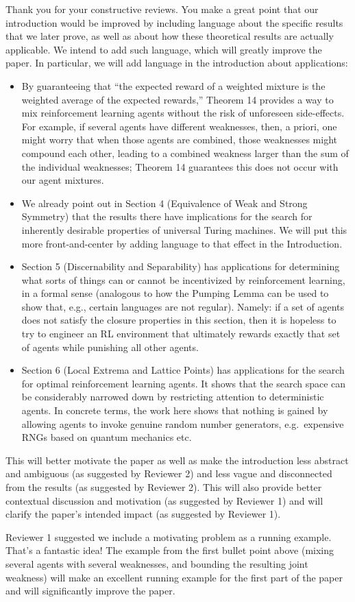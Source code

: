 \documentclass{article}
\begin{document}
Thank you for your constructive reviews. You make a great point that our introduction would
be improved by including language about the specific results that we later prove, as well as
about how these theoretical results are actually applicable. We intend to add such
language, which will greatly improve the paper. In particular, we will add language in
the introduction about applications:
\begin{itemize}
    \item
    By guaranteeing that ``the expected reward of a weighted mixture is the weighted
    average of the expected rewards,'' Theorem 14 provides a way to mix reinforcement
    learning agents without the risk of unforeseen side-effects. For example, if several
    agents have different weaknesses,
    then, a priori, one might worry that when those agents are combined, those weaknesses
    might compound each other, leading to a combined weakness larger than the sum of the
    individual weaknesses; Theorem 14
    guarantees this does not occur with our agent mixtures.
    \item
    We already point out in Section 4 (Equivalence of Weak and Strong Symmetry)
    that the results there
    have implications for the search for inherently desirable properties of universal Turing
    machines. We will put this more front-and-center by adding language to that effect in the
    Introduction.
    \item
    Section 5 (Discernability and Separability) has applications for determining what
    sorts of things can or cannot be incentivized by reinforcement learning, in a formal sense 
    (analogous to how the Pumping Lemma can be used to show that, e.g., certain
    languages are not regular). Namely: if a set of agents does not satisfy the
    closure properties in this
    section, then it is hopeless to try to engineer an RL environment that ultimately rewards
    exactly that set of agents while punishing all other agents.
    \item
    Section 6 (Local Extrema and Lattice Points) has applications for the search for
    optimal reinforcement learning agents. It shows that the search space can be
    considerably narrowed down by restricting attention to deterministic agents. In concrete
    terms, the work here shows that nothing is gained by allowing agents to invoke
    genuine random number generators, e.g.\ expensive RNGs based on quantum mechanics etc.
\end{itemize}
This will better motivate the paper as well as make the introduction less abstract and ambiguous (as suggested by Reviewer 2) and less vague and disconnected from the results (as suggested by Reviewer 2). This will also provide better contextual discussion and motivation (as suggested by Reviewer 1) and will clarify the paper's intended impact (as suggested by Reviewer 1).

Reviewer 1 suggested we include a motivating problem as a running example. That's a fantastic idea! The example from the first bullet point above (mixing several agents with several weaknesses, and bounding the resulting joint weakness) will make an excellent running example for the first part of the paper and will significantly improve the paper.
\end{document}
